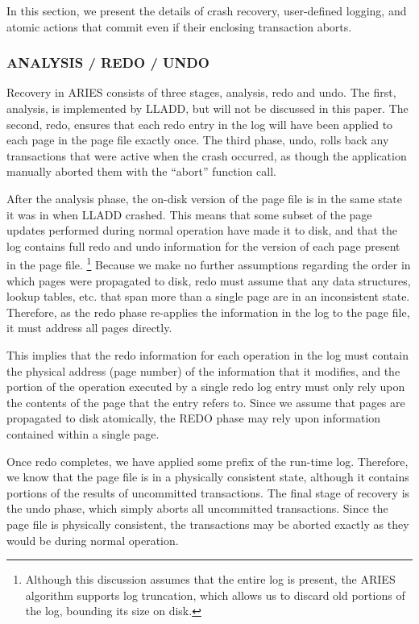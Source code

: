 \documentclass[letterpaper,english]{article}
\begin{document}
\begin{enumerate}
\begin{enumerate}
\begin{enumerate}
In this section, we present the details of crash recovery, user-defined logging, and atomic actions that commit even if their enclosing transaction aborts.

\subsubsection{ANALYSIS / REDO / UNDO}

Recovery in ARIES consists of three stages, analysis, redo and undo. 
The first, analysis, is
implemented by LLADD, but will not be discussed in this
paper. The second, redo, ensures that each redo entry in the log 
will have been applied to each page in the page file exactly once.
The third phase, undo, rolls back any transactions that were active
when the crash occurred, as though the application manually aborted
them with the {}``abort'' function call.
  
After the analysis phase, the on-disk version of the page file
is in the same state it was in when LLADD crashed. This means that
some subset of the page updates performed during normal operation
have made it to disk, and that the log contains full redo and undo
information for the version of each page present in the page file.%
\footnote{Although this discussion assumes that the entire log is present, the
ARIES algorithm supports log truncation, which allows us to discard
old portions of the log, bounding its size on disk.%
} Because we make no further assumptions regarding the order in which
pages were propagated to disk, redo must assume that any
data structures, lookup tables, etc. that span more than a single
page are in an inconsistent state. Therefore, as the redo phase re-applies
 the information in the log to the page file, it must address all pages directly. 

This implies that the redo information for each operation in the log
must contain the physical address (page number) of the information
that it modifies, and the portion of the operation executed by a single
redo log entry must only rely upon the contents of the page that the 
entry refers to. Since we assume that pages are propagated to disk
atomically, the REDO phase may rely upon information contained within
a single page.

Once redo completes, we have applied some prefix of the run-time log.
Therefore, we know that the page file is in
a physically consistent state, although it contains portions of the
results of uncommitted transactions. The final stage of recovery is
the undo phase, which simply aborts all uncommitted transactions. Since
the page file is physically consistent, the transactions may be aborted
exactly as they would be during normal operation. 



\end{enumerate}
\end{enumerate}
\end{enumerate}
\end{document}
